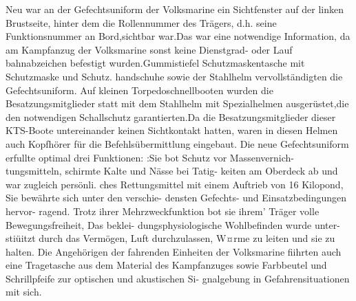 Neu war an der Gefechtsuniform der Volksmarine
ein Sichtfenster auf der linken Brustseite, hinter
dem die Rollennummer des Trägers, d.h. seine
Funktionsnummer an Bord,sichtbar war.Das war
eine notwendige Information, da am Kampfanzug
der Volksmarine sonst keine Dienstgrad- oder Lauf
bahnabzeichen befestigt wurden.Gummistiefel
Schutzmaskentasche mit Schutzmaske und Schutz.
handschuhe sowie der Stahlhelm vervollständigten
die Gefechtsuniform.
Auf kleinen Torpedoschnellbooten wurden die
Besatzungsmitglieder statt mit dem Stahlhelm mit
Spezialhelmen ausgerüstet,die den notwendigen
Schallschutz garantierten.Da die Besatzungsmitglieder dieser KTS-Boote untereinander keinen
Sichtkontakt hatten, waren in diesen Helmen auch
Kopfhörer für die Befehlsübermittlung eingebaut.
Die neue Gefechtsuniform erfullte optimal drei
Funktionen:
:Sie bot Schutz vor Massenvernich-
tungsmitteln, schirmte Kalte und Nässe bei Tatig-
keiten am Oberdeck ab und war zugleich persönli.
ches Rettungsmittel mit einem Auftrieb von
16 Kilopond, Sie bewährte sich unter den verschie-
densten Gefechts- und Einsatzbedingungen hervor-
ragend. Trotz ihrer Mehrzweckfunktion bot sie
ihrem' Träger volle Bewegungsfreiheit, Das beklei-
dungsphysiologische Wohlbefinden wurde unter-
stiüitzt durch das Vermögen, Luft durchzulassen,
W¤rme zu leiten und sie zu halten.
Die Angehörigen der fahrenden Einheiten der
Volksmarine fiihrten auch eine Tragetasche aus
dem Material des Kampfanzuges sowie Farbbeutel
und Schrillpfeife zur optischen und akustischen Si-
gnalgebung in Gefahrensituationen mit sich.